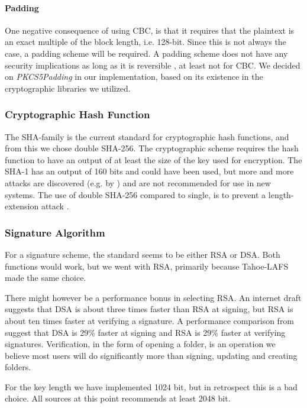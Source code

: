 \documentclass[pdftex,english,10pt,b5paper,twoside]{book}
\begin{document}
\paragraph{Padding} One negative consequence of using \ac{CBC}, is that it
requires that the plaintext is an exact multiple of the block length, i.e.
128-bit. Since this is not always the case, a padding scheme will be required.
A padding scheme does not have any security implications as long as it is
reversible \cite{schneier}, at least not for \ac{CBC}. We decided on
\emph{PKCS5Padding} in our implementation, based on its existence in the
cryptographic libraries we utilized.

\subsubsection{Cryptographic Hash Function}

The \ac{SHA}-family is the current standard for cryptographic hash functions,
and from this we chose double \ac{SHA}-256. The cryptographic scheme requires
the hash function to have an output of at least the size of the key used for
encryption. The \ac{SHA}-1 has an output of 160 bits and could have been used,
but more and more attacks are discovered (e.g. by \citet{sha1}) and are not
recommended for use in new systems. The use of double \ac{SHA}-256 compared to
single, is to prevent a length-extension attack \cite{schneier}.

\subsubsection{Signature Algorithm}

For a signature scheme, the standard seems to be either \ac{RSA} or \ac{DSA}.
Both functions would work, but we went with \ac{RSA}, primarily because
Tahoe-\ac{LAFS} made the same choice.

There might however be a performance bonus in selecting \ac{RSA}. An internet
draft \cite{dsa_sha2} suggests that \ac{DSA} is about three times faster than
\ac{RSA} at signing, but \ac{RSA} is about ten times faster at verifying a
signature. A performance comparison from \citet{msdn_perf} suggest that
\ac{DSA} is 29\% faster at signing and \ac{RSA} is 29\% faster at verifying
signatures. Verification, in the form of opening a folder, is an operation we
believe most users will do significantly more than signing, updating and
creating folders.

For the key length we have implemented 1024 bit, but in retrospect this is a
bad choice. All sources at this point recommends at least 2048 bit.
\end{document}

